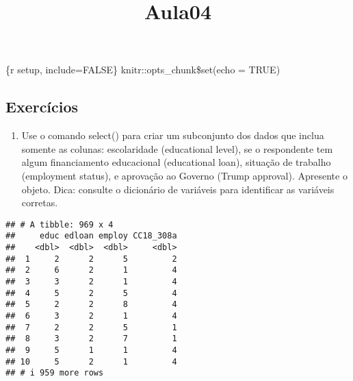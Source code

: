 \documentclass[
]{article}
\title{Aula04}
\author{}
\date{\vspace{-2.5em}}
\newenvironment{Shaded}{\begin{snugshade}}{\end{snugshade}}
\newcommand{\CommentTok}[1]{\textcolor[rgb]{0.56,0.35,0.01}{\textit{#1}}}
\newcommand{\DecValTok}[1]{\textcolor[rgb]{0.00,0.00,0.81}{#1}}
\newcommand{\FunctionTok}[1]{\textcolor[rgb]{0.13,0.29,0.53}{\textbf{#1}}}
\newcommand{\NormalTok}[1]{#1}
\newcommand{\OtherTok}[1]{\textcolor[rgb]{0.56,0.35,0.01}{#1}}
\newcommand{\SpecialCharTok}[1]{\textcolor[rgb]{0.81,0.36,0.00}{\textbf{#1}}}
\newcommand{\StringTok}[1]{\textcolor[rgb]{0.31,0.60,0.02}{#1}}
\providecommand{\tightlist}{%
  \setlength{\itemsep}{0pt}\setlength{\parskip}{0pt}}
\begin{document}
\maketitle

\{r setup, include=FALSE\} knitr::opts\_chunk\$set(echo = TRUE)

\subsection{Exercícios}\label{exercicios}

\begin{enumerate}
\def\labelenumi{\arabic{enumi})}
\tightlist
\item
  Use o comando select() para criar um subconjunto dos dados que inclua
  somente as colunas: escolaridade (educational level), se o respondente
  tem algum financiamento educacional (educational loan), situação de
  trabalho (employment status), e aprovação ao Governo (Trump approval).
  Apresente o objeto. Dica: consulte o dicionário de variáveis para
  identificar as variáveis corretas.
\end{enumerate}

\begin{Shaded}
\end{Shaded}

\begin{verbatim}
## # A tibble: 969 x 4
##     educ edloan employ CC18_308a
##    <dbl>  <dbl>  <dbl>     <dbl>
##  1     2      2      5         2
##  2     6      2      1         4
##  3     3      2      1         4
##  4     5      2      5         4
##  5     2      2      8         4
##  6     3      2      1         4
##  7     2      2      5         1
##  8     3      2      7         1
##  9     5      1      1         4
## 10     5      2      1         4
## # i 959 more rows
\end{verbatim}
\end{document}
